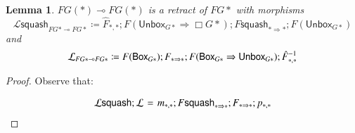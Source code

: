 \documentclass{article}
\newtheorem{lemma}[theorem]{Lemma}
\let\split\relax
\newcommand{\cat}[1]{\mathcal{#1}}
\newcommand{\lolli}{\multimap}
\newcommand{\split}[0]{\mathsf{split}}
\newcommand{\squash}[0]{\mathsf{squash}}
\newcommand{\Bx}[0]{\mathsf{Box}}
\newcommand{\Unbox}[0]{\mathsf{Unbox}}
\begin{document}
\begin{lemma}
  $FG(\ast) \lolli FG(\ast)$ is a retract of $FG\ast$ with morphisms
  \[
  \cat{L}\squash_{FG\ast \lolli FG\ast} \coloneqq \hat{F}_{\ast,\ast} ; F(\Unbox_{G\ast} \Rightarrow \Box{G\ast}); F \squash_{\ast \Rightarrow \ast} ; F(\Unbox_{G\ast})
  \]
  and
  \[
  \cat{L}\split_{FG \ast \lolli FG \ast} \coloneqq F(\Bx_{G\ast}) ; F\split_{\ast \Rightarrow \ast} ; F(\Bx_{G\ast} \Rightarrow \Unbox_{G\ast}) ;\hat{F}^{-1}_{\ast,\ast}
  \]
\end{lemma}
\begin{proof}
  Observe that:

  \[
  \setlength{\arraycolsep}{2px}
  \begin{array}{lll}
    \cat{L}\squash ; \cat{L}\split
    & = & m_{\ast,\ast} ; F \squash_{\ast \Rightarrow \ast} ; F \split_{\ast \Rightarrow \ast} ; p_{\ast,\ast} \\
   
  \end{array}
  \]

\end{proof}
\vspace{-15px}

\nocite{*}


\end{document}
